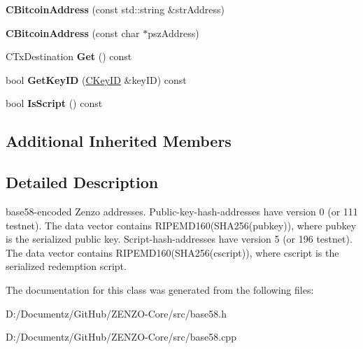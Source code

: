 \begin{DoxyCompactItemize}
{\bfseries C\+Bitcoin\+Address} (const std\+::string \&str\+Address)
\item 
\mbox{\label{class_c_bitcoin_address_ac0fd8d46f815948d471a8896997a3211}} 
{\bfseries C\+Bitcoin\+Address} (const char $\ast$psz\+Address)
\item 
\mbox{\label{class_c_bitcoin_address_a1e44de10dfc84d1fd2e15150f1e22b8e}} 
C\+Tx\+Destination {\bfseries Get} () const
\item 
\mbox{\label{class_c_bitcoin_address_af3d7c4547803b09144fc040320f687dd}} 
bool {\bfseries Get\+Key\+ID} (\mbox{\hyperlink{class_c_key_i_d}{C\+Key\+ID}} \&key\+ID) const
\item 
\mbox{\label{class_c_bitcoin_address_a9547fc1ef7cfc2288904e7eedab57a10}} 
bool {\bfseries Is\+Script} () const
\end{DoxyCompactItemize}
\subsection*{Additional Inherited Members}


\subsection{Detailed Description}
base58-\/encoded Zenzo addresses. Public-\/key-\/hash-\/addresses have version 0 (or 111 testnet). The data vector contains R\+I\+P\+E\+M\+D160(\+S\+H\+A256(pubkey)), where pubkey is the serialized public key. Script-\/hash-\/addresses have version 5 (or 196 testnet). The data vector contains R\+I\+P\+E\+M\+D160(\+S\+H\+A256(cscript)), where cscript is the serialized redemption script. 

The documentation for this class was generated from the following files\+:\begin{DoxyCompactItemize}
\item 
D\+:/\+Documentz/\+Git\+Hub/\+Z\+E\+N\+Z\+O-\/\+Core/src/base58.\+h\item 
D\+:/\+Documentz/\+Git\+Hub/\+Z\+E\+N\+Z\+O-\/\+Core/src/base58.\+cpp\end{DoxyCompactItemize}
